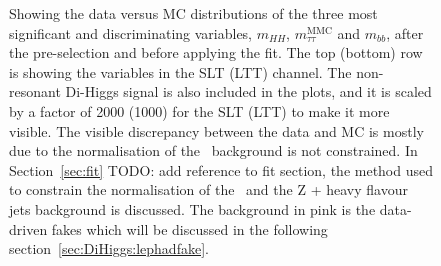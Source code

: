 \begin{figure}[htbp]
\begin{subfigure}{.32\textwidth}
\caption{}
\label{fig:MVAvariables:f}
\end{subfigure}
\caption{
    Showing the data versus MC distributions of the three most significant and discriminating variables, 
    $m_{HH}$, $m_{\tau\tau}^\text{MMC}$ and $m_{bb}$, after the pre-selection and before applying the fit.  
    The top (bottom) row is showing the variables in the SLT (LTT) channel. 
    The non-resonant Di-Higgs signal is also included in the plots, and it is 
    scaled by a factor of 2000 (1000) for the SLT (LTT) to make it more visible. 
    The visible discrepancy between the data and MC is mostly due to the normalisation 
    of the \ttbar\ background is not constrained.
    In Section~\ref{sec:fit} TODO: add reference to fit section, the method used to
    constrain the normalisation of the \ttbar\ and the Z + heavy flavour jets background 
    is discussed.
    The background in pink is the 
    data-driven fakes which will be discussed in the following section~\ref{sec:DiHiggs:lephadfake}.
    }
\label{fig:MVAvariables}
\end{figure}





    

